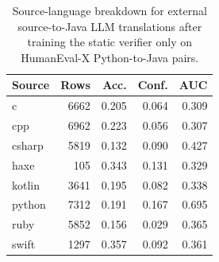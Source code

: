 \begin{table}[!htbp]
\centering
\scriptsize
\begin{tabular}{lrrrr}
\toprule
Source & Rows & Acc. & Conf. & AUC \\
\midrule
c & 6662 & 0.205 & 0.064 & 0.309 \\
cpp & 6962 & 0.223 & 0.056 & 0.307 \\
csharp & 5819 & 0.132 & 0.090 & 0.427 \\
haxe & 105 & 0.343 & 0.131 & 0.329 \\
kotlin & 3641 & 0.195 & 0.082 & 0.338 \\
python & 7312 & 0.191 & 0.167 & 0.695 \\
ruby & 5852 & 0.156 & 0.029 & 0.365 \\
swift & 1297 & 0.357 & 0.092 & 0.361 \\
\bottomrule
\end{tabular}
\vspace{0.5em}
\caption{Source-language breakdown for external source-to-Java LLM translations after training the static verifier only on HumanEval-X Python-to-Java pairs.}
\label{tab:llm-source-calibration}
\end{table}
